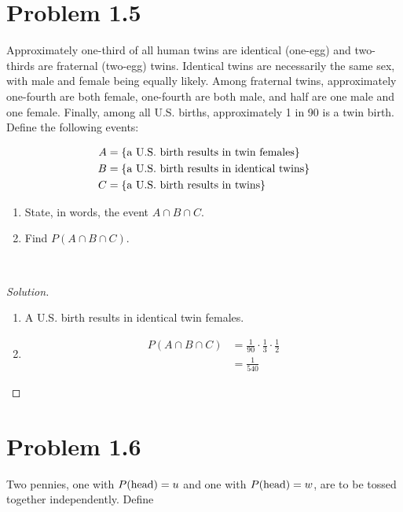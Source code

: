 \documentclass[12pt,letterpaper,reqno]{amsart}
\numberwithin{equation}{subsection}
\begin{document}
\newpage
\section{Problem 1.5} Approximately one-third of all human twins are identical (one-egg) and two-thirds are fraternal (two-egg) twins. Identical twins are necessarily the same sex, with male and female being equally likely. Among fraternal twins, approximately one-fourth are both female, one-fourth are both male, and half are one male and one female. Finally, among all U.S. births, approximately 1 in 90 is a twin birth. Define the following events:

\begin{align*}
    A &= \left\{ {\mbox{a U.S. birth results in twin females}} \right\} \\
    B &= \left\{ {\mbox{a U.S. birth results in identical twins}} \right\} \\
    C &= \left\{ {\mbox{a U.S. birth results in twins}} \right\}
\end{align*}

\begin{enumerate}[label=(\alph*), leftmargin=*]
    \item State, in words, the event $A \cap B \cap C$.
    \item Find $P(A \cap B \cap C)$.
\end{enumerate}~\\

\begin{proof}[Solution]~\\

\begin{enumerate}[label=(\alph*),leftmargin=*]
    \item A U.S. birth results in identical twin females.
    
    \item
    
    \begin{align*}
        P(A \cap B \cap C) &= \frac{1}{90} \cdot \frac{1}{3} \cdot \frac{1}{2} \\
                           &= \frac{1}{540}
    \end{align*}
\end{enumerate}
\end{proof}

\newpage
\section{Problem 1.6} Two pennies, one with ${P}\! \left( {\mbox{head}} \right) = u$ and one with ${P}\! \left( {\mbox{head}} \right) = w$, are to be tossed together independently. Define
\end{document}
